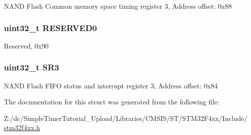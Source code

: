 N\-A\-N\-D Flash Common memory space timing register 3, Address offset\-: 0x88 \hypertarget{struct_f_s_m_c___bank3___type_def_af86c61a5d38a4fc9cef942a12744486b}{
\subsubsection[{R\-E\-S\-E\-R\-V\-E\-D0}]{\setlength{\rightskip}{0pt plus 5cm}uint32\-\_\-t R\-E\-S\-E\-R\-V\-E\-D0}}\label{struct_f_s_m_c___bank3___type_def_af86c61a5d38a4fc9cef942a12744486b}
Reserved, 0x90 \hypertarget{struct_f_s_m_c___bank3___type_def_af30c34f7c606cb9416a413ec5fa36491}{
\subsubsection[{S\-R3}]{ uint32\-\_\-t S\-R3}}\label{struct_f_s_m_c___bank3___type_def_af30c34f7c606cb9416a413ec5fa36491}
N\-A\-N\-D Flash F\-I\-F\-O status and interrupt register 3, Address offset\-: 0x84 

The documentation for this struct was generated from the following file\-:\begin{DoxyCompactItemize}
\item 
Z\-:/dc/\-Simple\-Timer\-Tutorial\-\_\-\-Upload/\-Libraries/\-C\-M\-S\-I\-S/\-S\-T/\-S\-T\-M32\-F4xx/\-Include/\hyperlink{stm32f4xx_8h}{stm32f4xx.\-h}\end{DoxyCompactItemize}
